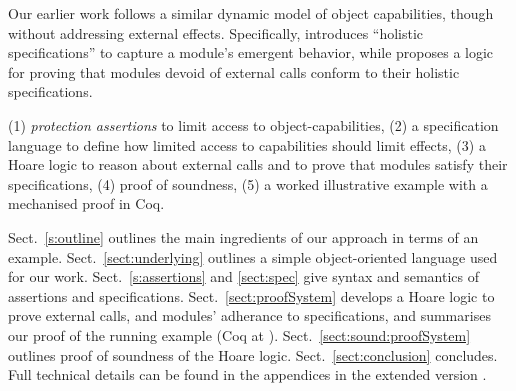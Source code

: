{Our earlier work}  
{\cite{FASE,OOPSLA22}   follows a
similar dynamic model of object capabilities, though without addressing external effects.}
Specifically, \cite{FASE}  introduces “holistic specifications” to capture a module’s emergent behavior, while
\cite{OOPSLA22}  proposes
a logic for proving that modules devoid of external calls conform to their holistic specifications.


 

 
(1) \emph{protection assertions} to limit access to object-capabilities, %
(2) a specification language to define how limited access to capabilities should limit effects, %
(3) a Hoare logic to reason about external calls and to prove that modules satisfy their %
specifications,
(4) proof of soundness,
(5) a worked illustrative example {with a mechanised proof in Coq}.
 

Sect.\ \ref{s:outline}   outlines the main ingredients of our approach in terms of an {example}.
Sect.\ \ref{sect:underlying} outlines a simple object-oriented language used for our work. 
Sect.\ \ref{s:assertions} and 
\ref{sect:spec}  give syntax and semantics of assertions  and  specifications.
Sect.\ \ref{sect:proofSystem} develops a Hoare logic  
 to prove external calls, and modules' adherance to  specifications, and summarises our  proof
  of  the running example 
 (Coq  at \cite{CoqOOPSLA25}).
Sect.\ \ref{sect:sound:proofSystem} outlines %
proof of soundness of
the Hoare logic. 
 Sect.\ \ref{sect:conclusion} concludes. %
Full  technical details can be found in the appendices 
{in the extended version \cite{externalCallsFull}.}

